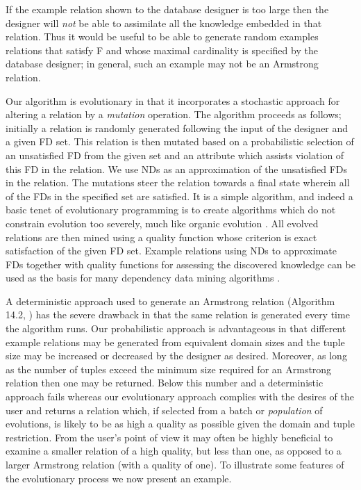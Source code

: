 If the example relation shown to the database designer is too large then 
the designer will {\em not} be able to assimilate all the knowledge embedded in
that relation. Thus it would be useful to be able to generate random examples 
relations that satisfy F and whose maximal cardinality is specified by the 
database designer; in general, such an example may not be an Armstrong
relation.

\smallskip

Our algorithm is evolutionary in that it incorporates a stochastic approach
for altering a relation by a {\em mutation} operation.
 The algorithm proceeds as
follows; initially a relation is randomly generated following
the input of the designer and a given FD set. This relation is then
 mutated based on a probabilistic selection of an unsatisfied FD  from the
given set and an attribute which assists violation of this FD in the relation.
We use NDs as an
approximation of the unsatisfied FDs in the relation. 
The mutations steer the relation
towards a final state wherein all of the FDs in the specified set are
satisfied. It is a simple algorithm, and indeed a basic tenet 
of evolutionary programming is to create algorithms 
which do not constrain evolution too severely,
 much like organic evolution \cite{bs93}. All evolved relations are then mined 
using a quality function whose criterion is exact satisfaction of the given FD set. Example relations using NDs to approximate FDs together
with quality functions for assessing the discovered knowledge 
can be used as the basis for many dependency data mining algorithms \cite{kdd96}.

\smallskip

A deterministic approach used to generate an Armstrong relation
(Algorithm 14.2, \cite{Mann92}) has the severe drawback
 in that the same relation
is generated every time the algorithm runs.  Our probabilistic
approach is advantageous in that different example relations may
be generated from equivalent domain sizes and the tuple size may be
increased or decreased by the designer as desired. Moreover, as long as 
the number of tuples exceed the minimum size required for an Armstrong relation
 \cite{bdfs84,mr86} then one may
be returned.  Below this number and a deterministic approach fails
 whereas our evolutionary approach complies with the desires of the user
and returns a relation which, if selected from a batch or {\em 
population} of evolutions, is likely to be as high a quality
as possible given the domain and tuple restriction.  From the user's
point of view it may often be highly beneficial to examine a smaller
relation of a high quality, but less than one, as opposed to a larger Armstrong
relation (with a quality of one). To illustrate some
features of the evolutionary process we now present an example.

